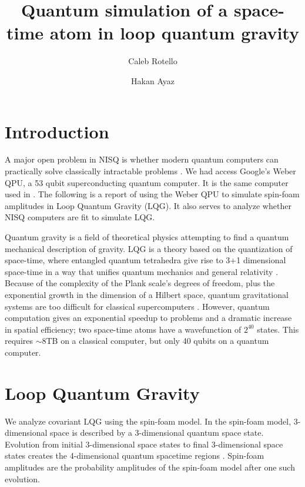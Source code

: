 \documentclass[a4paper,11pt,aps,tightenlines,nofootinbib]{revtex4}
\begin{document}
\title{Quantum simulation of a space-time atom in loop quantum gravity}
\author{Caleb Rotello}
\author{Hakan Ayaz}

\begin{abstract}
\end{abstract}


\maketitle


\section{Introduction}
        A major open problem in NISQ is whether modern quantum computers can practically solve classically intractable problems \cite{nisq}.
        We had access Google's Weber QPU, a 53 qubit superconducting quantum computer. It is the same computer used in \cite{supremacy}. 
        The following is a report of using the Weber QPU to simulate spin-foam amplitudes in Loop Quantum Gravity (LQG). It also serves to 
        analyze whether NISQ computers are fit to simulate LQG.

        Quantum gravity is a field of theoretical physics attempting to find a quantum mechanical description of gravity.
        LQG is a theory based on the quantization of space-time, where entangled quantum tetrahedra give rise to 3+1 dimensional space-time in a way that 
        unifies quantum mechanics and general relativity \cite{ashketar}. Because of the complexity of the Plank scale's degrees of freedom, plus the exponential
        growth in the dimension of a Hilbert space, quantum gravitational systems are too difficult for classical supercomputers \cite{ibm-qsim-qubit-of-space}. 
        However, quantum computation gives an exponential speedup to problems and a dramatic increase in spatial efficiency; two space-time atoms have a wavefunction of 
        $2^{40}$ states. This requires $\sim 8$TB on a classical computer, but only 40 qubits on a quantum computer.


\section{Loop Quantum Gravity}
        We analyze covariant LQG using the spin-foam model. In the spin-foam model,
        3-dimensional space is described by a 3-dimensional quantum space state. Evolution from 
        initial 3-dimensional space states to final 3-dimensional space states creates the 4-dimensional quantum spacetime regions \cite{covariant-lqg}. 
        Spin-foam amplitudes are the probability amplitudes of the spin-foam model after one such evolution.
\end{document}
